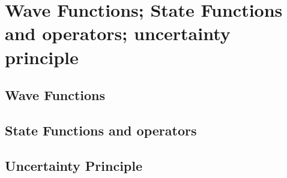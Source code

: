 
\section{Wave Functions; State Functions and operators; uncertainty principle}
\subsection{Wave Functions}
\subsection{State Functions and operators}
\subsection{Uncertainty Principle}

